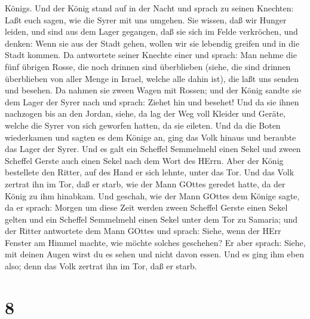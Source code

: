 Königs.  Und der König stand auf in der Nacht und sprach zu
seinen Knechten: Laßt euch sagen, wie die Syrer mit uns umgehen. Sie
wissen, daß wir Hunger leiden, und sind aus dem Lager gegangen, daß sie
sich im Felde verkröchen, und denken: Wenn sie aus der Stadt gehen,
wollen wir sie lebendig greifen und in die Stadt kommen. 
Da antwortete seiner Knechte einer und sprach: Man nehme die fünf
übrigen Rosse, die noch drinnen sind überblieben (siehe, die sind
drinnen überblieben von aller Menge in Israel, welche alle dahin ist),
die laßt uns senden und besehen.  Da nahmen sie zween Wagen
mit Rossen; und der König sandte sie dem Lager der Syrer nach und
sprach: Ziehet hin und besehet!  Und da sie ihnen nachzogen
bis an den Jordan, siehe, da lag der Weg voll Kleider und Geräte, welche
die Syrer von sich geworfen hatten, da sie eileten. Und da die Boten
wiederkamen und sagten es dem Könige an,  ging das Volk
hinaus und beraubte das Lager der Syrer. Und es galt ein Scheffel
Semmelmehl einen Sekel und zween Scheffel Gerste auch einen Sekel nach
dem Wort des HErrn.  Aber der König bestellete den Ritter,
auf des Hand er sich lehnte, unter das Tor. Und das Volk zertrat ihn im
Tor, daß er starb, wie der Mann GOttes geredet hatte, da der König zu
ihm hinabkam.  Und geschah, wie der Mann GOttes dem Könige
sagte, da er sprach: Morgen um diese Zeit werden zween Scheffel Gerste
einen Sekel gelten und ein Scheffel Semmelmehl einen Sekel unter dem Tor
zu Samaria;  und der Ritter antwortete dem Mann GOttes und
sprach: Siehe, wenn der HErr Fenster am Himmel machte, wie möchte
solches geschehen? Er aber sprach: Siehe, mit deinen Augen wirst du es
sehen und nicht davon essen.  Und es ging ihm eben also;
denn das Volk zertrat ihn im Tor, daß er starb.

\hypertarget{section-7}{%
\section{8}\label{section-7}}

